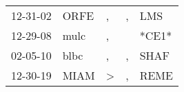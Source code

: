 \begin{supertabular}{lllll}
 12-31-02 &  ORFE &             , &  , &    LMS \\
 12-29-08 &  mulc &             , &    &  *CE1* \\
 02-05-10 &  blbc &             , &  , &   SHAF \\
 12-30-19 &  MIAM &  \textgreater &  , &   REME \\
\end{supertabular}
